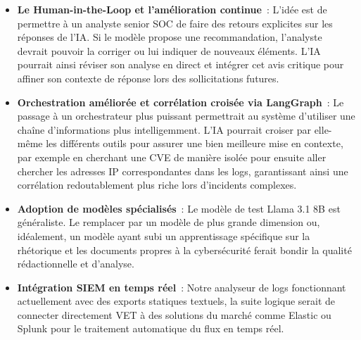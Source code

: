 \documentclass[runningheads]{llncs}
\begin{document}
\begin{itemize}
    \item \textbf{Le Human-in-the-Loop et l'amélioration continue}~: L'idée est de permettre à un analyste senior SOC de faire des retours explicites sur les réponses de l'IA. Si le modèle propose une recommandation, l'analyste devrait pouvoir la corriger ou lui indiquer de nouveaux éléments. L'IA pourrait ainsi réviser son analyse en direct et intégrer cet avis critique pour affiner son contexte de réponse lors des sollicitations futures.
    \item \textbf{Orchestration améliorée et corrélation croisée via LangGraph}~: Le passage à un orchestrateur plus puissant permettrait au système d'utiliser une chaîne d'informations plus intelligemment. L'IA pourrait croiser par elle-même les différents outils pour assurer une bien meilleure mise en contexte, par exemple en cherchant une CVE de manière isolée pour ensuite aller chercher les adresses IP correspondantes dans les logs, garantissant ainsi une corrélation redoutablement plus riche lors d'incidents complexes.
    \item \textbf{Adoption de modèles spécialisés}~: Le modèle de test Llama 3.1 8B est généraliste. Le remplacer par un modèle de plus grande dimension ou, idéalement, un modèle ayant subi un apprentissage spécifique sur la rhétorique et les documents propres à la cybersécurité ferait bondir la qualité rédactionnelle et d'analyse.
    \item \textbf{Intégration SIEM en temps réel}~: Notre analyseur de logs fonctionnant actuellement avec des exports statiques textuels, la suite logique serait de connecter directement VET à des solutions du marché comme Elastic ou Splunk pour le traitement automatique du flux en temps réel.
\end{itemize}


\newpage


\end{document}
